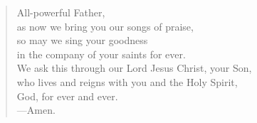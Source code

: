 \prayer

\setlength{\leftmargini}{\prayerleftmargini}

\begin{verse}
All-powerful Father,\\
as now we bring you our songs of praise,\\
so may we sing your goodness\\
in the company of your saints for ever.\\
We ask this through our Lord Jesus Christ, your Son,\\
who lives and reigns with you and the Holy Spirit,\\
God, for ever and ever.\\
{\color{red}---\thinspace}Amen.
\end{verse}

\setlength{\leftmargini}{\defleftmargini}